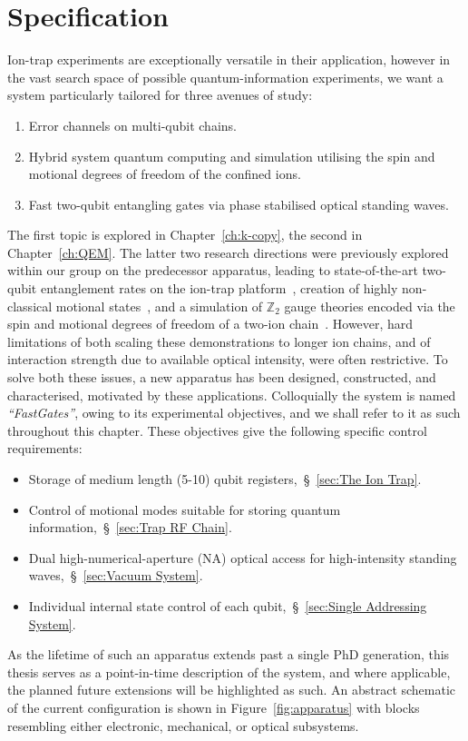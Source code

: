 \section{Specification}
\label{sec:Spec}
    Ion-trap experiments are exceptionally versatile in their application, however in the vast search space of possible quantum-information experiments, we want a system particularly tailored for three avenues of study: 
    \begin{enumerate}
        \item Error channels on multi-qubit chains.
        \item Hybrid system quantum computing and simulation utilising the spin and motional degrees of freedom of the confined ions.
        \item Fast two-qubit entangling gates via phase stabilised optical standing waves.
    \end{enumerate}
    The first topic is explored in Chapter~\ref{ch:k-copy}, the second in Chapter~\ref{ch:QEM}. The latter two research directions were previously explored within our group on the predecessor apparatus, leading to state-of-the-art two-qubit entanglement rates
    on the ion-trap platform~\cite{schafer_fast_2018,saner_breaking_2023}, creation
    of highly non-classical motional
    states~\cite{bazavan_squeezing_2026,saner_generating_2026}, and a simulation of
    $\mathbb{Z}_2$ gauge theories encoded via the spin and motional degrees of freedom of a
    two-ion chain~\cite{bazavan_synthetic_2024,saner_aharonovbohm_2026}. However, hard
    limitations of both scaling these demonstrations to longer ion chains, and
    of interaction strength due to available optical intensity, were often
    restrictive. To solve both these issues, a new apparatus has been designed,
    constructed, and characterised, motivated by these applications. Colloquially
    the system is named \textit{``FastGates''}, owing to its
    experimental objectives, and we shall refer to it as such throughout this
    chapter. 
    These objectives give the following specific control requirements:
    \begin{itemize}
        \item Storage of medium length (5-10) qubit registers,~\S~\ref{sec:The Ion Trap}.
        \item Control of motional modes suitable for storing quantum information,~\S~\ref{sec:Trap RF Chain}.
        \item Dual high-numerical-aperture (NA) optical access for high-intensity standing waves,~\S~\ref{sec:Vacuum System}.
        \item Individual internal state control of each qubit,~\S~\ref{sec:Single Addressing System}.
    \end{itemize}
    As the lifetime of such an apparatus extends past a single PhD generation,
    this thesis serves as a point-in-time description of the system, and where
    applicable, the planned future extensions will be highlighted as such. An
    abstract schematic of the current configuration is shown in
    Figure~\ref{fig:apparatus} with blocks resembling either electronic,
    mechanical, or optical subsystems.

